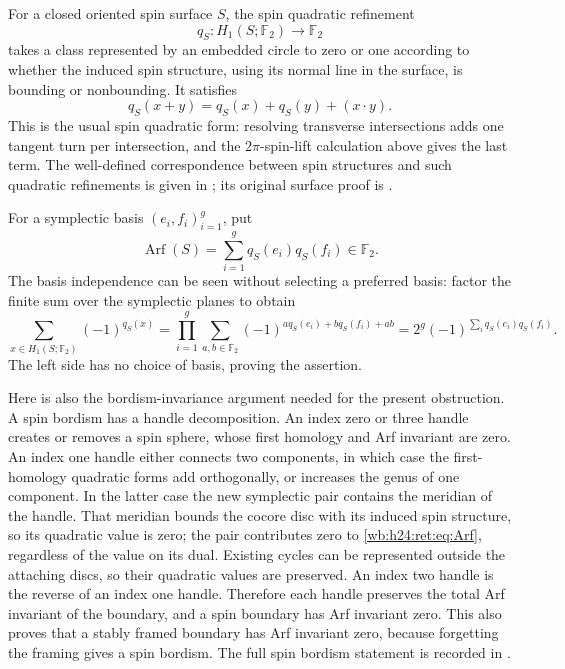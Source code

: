 For a closed oriented spin surface \(S\), the spin quadratic
refinement
\[
 q_S:H_1(S;\mathbb F_2)\longrightarrow\mathbb F_2
\]
takes a class represented by an embedded circle to zero or one
according to whether the induced spin structure, using its normal
line in the surface, is bounding or nonbounding.  It satisfies
\begin{equation}
 q_S(x+y)=q_S(x)+q_S(y)+(x\mathbin{\cdot}y).
 \label{wb:h24:ret:eq:quadratic}
\end{equation}
This is the usual spin quadratic form: resolving transverse
intersections adds one tangent turn per intersection, and the
\(2\pi\)-spin-lift calculation above gives the last term.  The
well-defined correspondence between spin structures and such
quadratic refinements is given in
\cite[Theorem 3.2 and Remark 3.3]{DebrayGunningham2018Root}; its original
surface proof is \cite{Johnson1980Root}.

For a symplectic basis \((e_i,f_i)_{i=1}^g\), put
\begin{equation}
 \operatorname{Arf}(S)=\sum_{i=1}^gq_S(e_i)q_S(f_i)\in\mathbb F_2.
 \label{wb:h24:ret:eq:Arf}
\end{equation}
The basis independence can be seen without selecting a preferred
basis: factor the finite sum over the symplectic planes to obtain
\[
 \sum_{x\in H_1(S;\mathbb F_2)}(-1)^{q_S(x)}
   =\prod_{i=1}^g
     \sum_{a,b\in\mathbb F_2}(-1)^{a q_S(e_i)+b q_S(f_i)+ab}
   =2^g(-1)^{\sum_i q_S(e_i)q_S(f_i)}.
\]
The left side has no choice of basis, proving the assertion.

Here is also the bordism-invariance argument needed for the present
obstruction.  A spin bordism has a handle decomposition.  An index
zero or three handle creates or removes a spin sphere, whose first
homology and Arf invariant are zero.  An index one handle either
connects two components, in which case the first-homology quadratic
forms add orthogonally, or increases the genus of one component.
In the latter case the new symplectic pair contains the meridian
of the handle.  That meridian bounds the cocore disc with its
induced spin structure, so its quadratic value is zero; the pair
contributes zero to \eqref{wb:h24:ret:eq:Arf}, regardless of the value on its
dual.  Existing cycles can be represented outside the attaching
discs, so their quadratic values are preserved.  An index two
handle is the reverse of an index one handle.  Therefore each
handle preserves the total Arf invariant of the boundary, and a
spin boundary has Arf invariant zero.  This also proves that a
stably framed boundary has Arf invariant zero, because forgetting
the framing gives a spin bordism.  The full spin bordism statement
is recorded in \cite[Theorem 3.6]{DebrayGunningham2018Root}.


